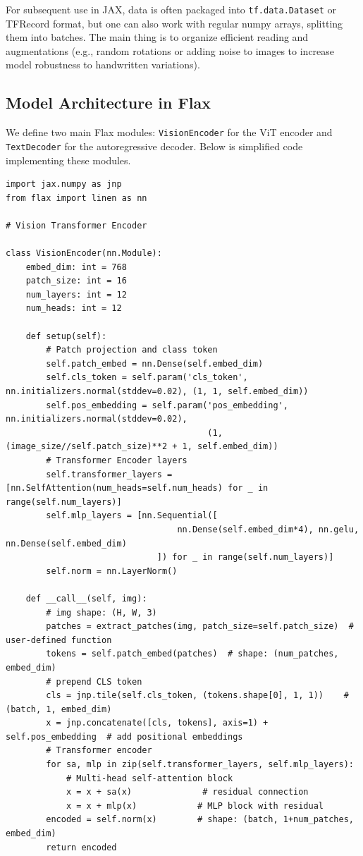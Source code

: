\documentclass{article}
\begin{document}
For subsequent use in JAX, data is often packaged into \texttt{tf.data.Dataset} or TFRecord format, but one can also work with regular numpy arrays, splitting them into batches. The main thing is to organize efficient reading and augmentations (e.g., random rotations or adding noise to images to increase model robustness to handwritten variations).

\subsection{Model Architecture in Flax}

We define two main Flax modules: \texttt{VisionEncoder} for the ViT encoder and \texttt{TextDecoder} for the autoregressive decoder. Below is simplified code implementing these modules.

\begin{lstlisting}
import jax.numpy as jnp
from flax import linen as nn

# Vision Transformer Encoder

class VisionEncoder(nn.Module):
    embed_dim: int = 768
    patch_size: int = 16
    num_layers: int = 12
    num_heads: int = 12

    def setup(self):
        # Patch projection and class token
        self.patch_embed = nn.Dense(self.embed_dim)
        self.cls_token = self.param('cls_token', nn.initializers.normal(stddev=0.02), (1, 1, self.embed_dim))
        self.pos_embedding = self.param('pos_embedding', nn.initializers.normal(stddev=0.02),
                                        (1, (image_size//self.patch_size)**2 + 1, self.embed_dim))
        # Transformer Encoder layers
        self.transformer_layers = [nn.SelfAttention(num_heads=self.num_heads) for _ in range(self.num_layers)]
        self.mlp_layers = [nn.Sequential([
                                  nn.Dense(self.embed_dim*4), nn.gelu, nn.Dense(self.embed_dim)
                              ]) for _ in range(self.num_layers)]
        self.norm = nn.LayerNorm()

    def __call__(self, img):
        # img shape: (H, W, 3)
        patches = extract_patches(img, patch_size=self.patch_size)  # user-defined function
        tokens = self.patch_embed(patches)  # shape: (num_patches, embed_dim)
        # prepend CLS token
        cls = jnp.tile(self.cls_token, (tokens.shape[0], 1, 1))    # (batch, 1, embed_dim)
        x = jnp.concatenate([cls, tokens], axis=1) + self.pos_embedding  # add positional embeddings
        # Transformer encoder
        for sa, mlp in zip(self.transformer_layers, self.mlp_layers):
            # Multi-head self-attention block
            x = x + sa(x)              # residual connection
            x = x + mlp(x)            # MLP block with residual
        encoded = self.norm(x)        # shape: (batch, 1+num_patches, embed_dim)
        return encoded
\end{lstlisting}
\end{document}

